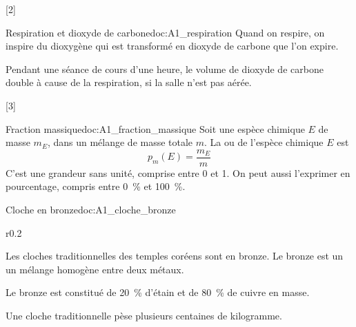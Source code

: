 [2]

\begin{doc}{Respiration et dioxyde de carbone}{doc:A1_respiration}
  Quand on respire, on inspire du dioxygène  qui est transformé en dioxyde de carbone  que l'on expire.

  Pendant une séance de cours d'une heure, le volume de dioxyde de carbone  double à cause de la respiration, si la salle n'est pas aérée.
\end{doc}

[3]


\begin{doc}{Fraction massique}{doc:A1_fraction_massique}
  Soit une espèce chimique $E$ de masse $m_E$, dans un mélange de masse totale $m$.
  La  ou  de l'espèce chimique $E$ est
  \begin{equation*}
    p_{m}(E) = \frac{m_E}{m}
  \end{equation*}
  C'est une grandeur sans unité, comprise entre 0 et 1.
  On peut aussi l'exprimer en pourcentage, compris entre \qty{0}{\percent} et \qty{100}{\percent}.
\end{doc}

\begin{doc}{Cloche en bronze}{doc:A1_cloche_bronze}
  \begin{wrapfigure}[5]{r}{0.2\linewidth}
    \vspace*{-31pt}
    \centering
  \end{wrapfigure}
  
  Les cloches traditionnelles des temples coréens sont en bronze.
  Le bronze est un  un mélange homogène entre deux métaux.
  
  Le bronze est constitué de \qty{20}{\percent} d'étain  et de \qty{80}{\percent} de cuivre  en masse.

  Une cloche traditionnelle pèse plusieurs centaines de kilogramme.
\end{doc}


